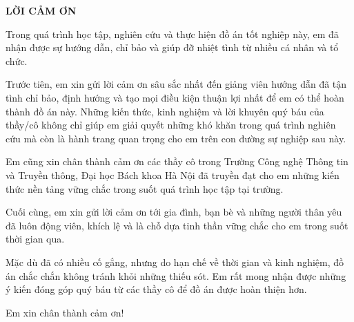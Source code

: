 \documentclass[../DoAn.tex]{subfiles}
\begin{document}
\begin{center}
    \Large{\textbf{LỜI CẢM ƠN}}\\
\end{center}
\vspace{1cm}
Trong quá trình học tập, nghiên cứu và thực hiện đồ án tốt nghiệp này, em đã nhận được sự hướng dẫn, chỉ bảo và giúp đỡ nhiệt tình từ nhiều cá nhân và tổ chức.

Trước tiên, em xin gửi lời cảm ơn sâu sắc nhất đến giảng viên hướng dẫn đã tận tình chỉ bảo, định hướng và tạo mọi điều kiện thuận lợi nhất để em có thể hoàn thành đồ án này. Những kiến thức, kinh nghiệm và lời khuyên quý báu của thầy/cô không chỉ giúp em giải quyết những khó khăn trong quá trình nghiên cứu mà còn là hành trang quan trọng cho em trên con đường sự nghiệp sau này.

Em cũng xin chân thành cảm ơn các thầy cô trong Trường Công nghệ Thông tin và Truyền thông, Đại học Bách khoa Hà Nội đã truyền đạt cho em những kiến thức nền tảng vững chắc trong suốt quá trình học tập tại trường.

Cuối cùng, em xin gửi lời cảm ơn tới gia đình, bạn bè và những người thân yêu đã luôn động viên, khích lệ và là chỗ dựa tinh thần vững chắc cho em trong suốt thời gian qua.

Mặc dù đã có nhiều cố gắng, nhưng do hạn chế về thời gian và kinh nghiệm, đồ án chắc chắn không tránh khỏi những thiếu sót. Em rất mong nhận được những ý kiến đóng góp quý báu từ các thầy cô để đồ án được hoàn thiện hơn.

Em xin chân thành cảm ơn!
\end{document}
